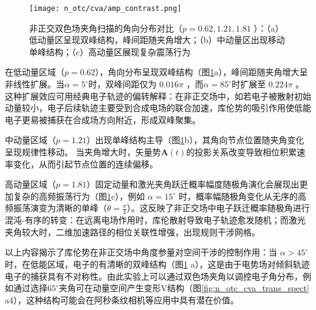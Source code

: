 \begin{figure}[!htbp]
	\centering
	\texttt{[image: n\_otc/cva/amp\_contrast.png]}
	\caption{非正交双色场夹角扫描的角向分布对比（$p=0.62,1.21,1.81$ ）：（a）低动量区呈现双峰结构，峰间距随夹角增大；（b）中动量区出现移动单峰结构；（c）高动量区展现复杂震荡行为}
	\label{amp_contrast}
\end{figure}

在低动量区域（$p=0.62$），角向分布呈现双峰结构（图\ref{amp_contrast}a），峰间距随夹角增大呈非线性扩展。当$\alpha=5^\circ$时，双峰间距仅为 $0.016\pi$ ，而$\alpha=85^\circ$时扩展至 $0.224 \pi$ 。这种扩展效应可用经典电子轨迹的偏转解释：在非正交场中，如若电子被散射初始动量较小，电子后续轨迹主要受到合成电场的联合加速，库伦势的吸引作用使低能电子更易被捕获在合成场方向附近，形成双峰聚集。

中动量区域（$p=1.21$）出现单峰结构主导（图\ref{amp_contrast}b），其角向节点位置随夹角变化呈现规律性移动。
当夹角增大时，矢量势$\mathbf{A}(t)$的投影关系改变导致相位积累速率变化，从而引起节点位置的连续偏移。

高动量区域（$p=1.81$）固定动量和激光夹角跃迁概率幅度随极角演化会展现出更加复杂的高频振荡行为（图\ref{amp_contrast}c），例如 $\alpha = 15^\circ$ 时，概率幅随极角变化从无序的高频振荡演变为清晰的单峰（$\theta=\frac{\pi}{4}$）。这反映了非正交场中电子跃迁概率随极角进行混沌-有序的转变：在远离电场作用时，库伦散射导致电子轨迹愈发随机；而激光夹角较大时，二维加速路径的相位关联性增强，出现规则干涉网格。

以上内容揭示了库伦势在非正交场中角度参量对空间干涉的控制作用：当 $\alpha>45^\circ$ 时，在低能区域，电子的有清晰的双峰结构（图\ref{amp_contrast} a），这是由于电势场对倾斜轨迹电子的捕获具有不对称性。由此实验上可以通过双色场夹角以调控电子角分布，例如通过选择$65^\circ$夹角可在动量空间产生变形V结构（图\ref{fig:n_otc_cva_trans_spect} a4），这种结构可能会在阿秒条纹相机等应用中具有潜在价值。


